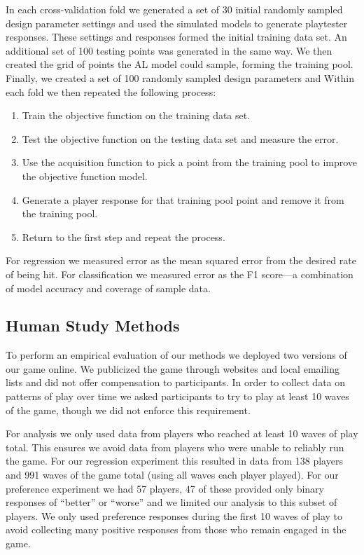 \documentclass{sig-alternate}
\begin{document}
In each cross-validation fold we generated a set of 30 initial randomly sampled design parameter settings and used the simulated models to generate playtester responses.
These settings and responses formed the initial training data set.
An additional set of 100 testing points was generated in the same way.
We then created the grid of points the AL model could sample, forming the training pool.
Finally, we created a set of 100 randomly sampled design parameters and 
Within each fold we then repeated the following process:
\begin{enumerate}
\item Train the objective function on the training data set.
\item Test the objective function on the testing data set and measure the error.
\item Use the acquisition function to pick a point from the training pool to improve the objective function model.
\item Generate a player response for that training pool point and remove it from the training pool.
\item Return to the first step and repeat the process.
\end{enumerate}
\noindent For regression we measured error as the mean squared error from the desired rate of being hit.
For classification we measured error as the F1 score---a combination of model accuracy and coverage of sample data.



\subsection{Human Study Methods}

To perform an empirical evaluation of our methods we deployed two versions of our game online.
We publicized the game through websites and local emailing lists and did not offer compensation to participants.
In order to collect data on patterns of play over time we asked participants to try to play at least 10 waves of the game, though we did not enforce this requirement.

For analysis we only used data from players who reached at least 10 waves of play total.
This ensures we avoid data from players who were unable to reliably run the game.
For our regression experiment this resulted in data from 138 players and 991 waves of the game total (using all waves each player played).
For our preference experiment we had 57 players, 47 of these provided only binary responses of ``better'' or ``worse'' and we limited our analysis to this subset of players.
We only used preference responses during the first 10 waves of play to avoid collecting many positive responses from those who remain engaged in the game.
\end{document}
